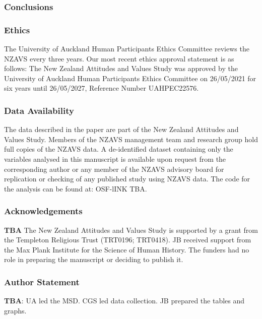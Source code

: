 \documentclass[
  single column]{article}
\begin{document}
\newpage{}

\subsubsection{Conclusions}\label{conclusions}

\subsubsection{Ethics}\label{ethics}

The University of Auckland Human Participants Ethics Committee reviews
the NZAVS every three years. Our most recent ethics approval statement
is as follows: The New Zealand Attitudes and Values Study was approved
by the University of Auckland Human Participants Ethics Committee on
26/05/2021 for six years until 26/05/2027, Reference Number UAHPEC22576.

\subsubsection{Data Availability}\label{data-availability}

The data described in the paper are part of the New Zealand Attitudes
and Values Study. Members of the NZAVS management team and research
group hold full copies of the NZAVS data. A de-identified dataset
containing only the variables analysed in this manuscript is available
upon request from the corresponding author or any member of the NZAVS
advisory board for replication or checking of any published study using
NZAVS data. The code for the analysis can be found at: OSF-lINK TBA.

\subsubsection{Acknowledgements}\label{acknowledgements}

\textbf{TBA} The New Zealand Attitudes and Values Study is supported by
a grant from the Templeton Religious Trust (TRT0196; TRT0418). JB
received support from the Max Plank Institute for the Science of Human
History. The funders had no role in preparing the manuscript or deciding
to publish it.

\subsubsection{Author Statement}\label{author-statement}

\textbf{TBA}: UA led the MSD. CGS led data collection. JB prepared the
tables and graphs.
\end{document}

